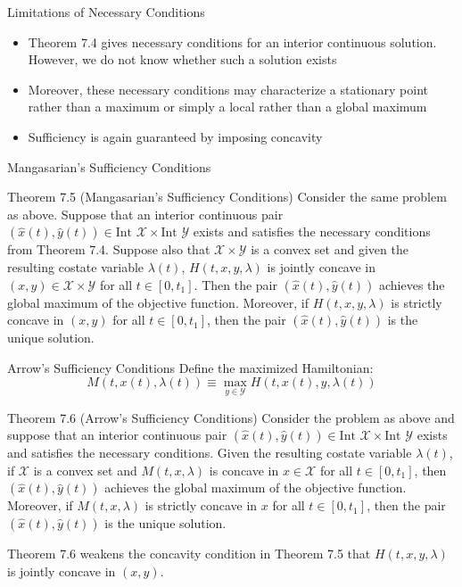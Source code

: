 \documentclass[9pt,aspectratio=169]{beamer}
\newcommand{\X}{\mathcal{X}}
\newcommand{\Y}{\mathcal{Y}}
\begin{document}
\begin{frame}{Limitations of Necessary Conditions}
\begin{itemize}
    \item Theorem 7.4 gives necessary conditions for an interior continuous
    solution. However, we do not know whether such a solution exists
    \item Moreover, these necessary conditions may characterize a stationary
    point rather than a maximum or simply a local rather than a global
    maximum
    \item Sufficiency is again guaranteed by imposing concavity
\end{itemize}
\end{frame}

\begin{frame}{Mangasarian's Sufficiency Conditions}

\begin{block}{Theorem 7.5 (Mangasarian's Sufficiency Conditions)}
    Consider the same problem as above. Suppose that an interior continuous
    pair $(\hat{x}(t), \hat{y}(t)) \in \text{Int } \X \times \text{Int } \Y$ exists and
    satisfies the necessary conditions from Theorem 7.4. Suppose also that
    $\X \times \Y$ is a convex set and given the resulting costate variable
    $\lambda(t)$, $H(t, x, y, \lambda)$ is jointly concave in $(x, y) \in \X
    \times \Y$ for all $t \in [0, t_1]$. Then the pair $(\hat{x}(t),
    \hat{y}(t))$ achieves the global maximum of the objective function.
    Moreover, if $H(t, x, y, \lambda)$ is strictly concave in $(x, y)$ for
    all $t \in [0, t_1]$, then the pair $(\hat{x}(t), \hat{y}(t))$ is the
    unique solution.
\end{block}
\end{frame}

\begin{frame}{Arrow's Sufficiency Conditions}
    Define the maximized Hamiltonian:
    $$M(t, x(t), \lambda(t)) \equiv \max_{y \in \Y} H(t, x(t), y, \lambda(t))$$
\begin{block}{Theorem 7.6 (Arrow's Sufficiency Conditions)}
    Consider the problem as above and suppose that an interior continuous
    pair $(\hat{x}(t), \hat{y}(t)) \in \text{Int } \X \times \text{Int } \Y$ exists and
    satisfies the necessary conditions. Given the resulting costate variable
    $\lambda(t)$, if $\X$ is a convex set and $M(t, x, \lambda)$ is concave
    in $x \in \X$ for all $t \in [0, t_1]$, then $(\hat{x}(t), \hat{y}(t))$
    achieves the global maximum of the objective function. Moreover, if $M(t,
    x, \lambda)$ is strictly concave in $x$ for all $t \in [0, t_1]$, then
    the pair $(\hat{x}(t), \hat{y}(t))$ is the unique solution.
\end{block}

Theorem 7.6 weakens the concavity condition in Theorem 7.5 that $H(t, x, y,
\lambda)$ is jointly concave in $(x, y)$.
\end{frame}
\end{document}
